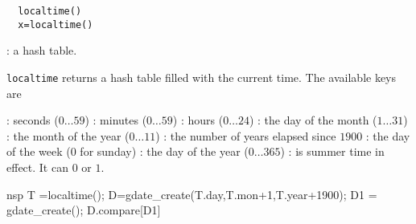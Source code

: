 \begin{mandesc}
\end{mandesc}

\begin{calling_sequence}
\begin{verbatim}
  localtime()
  x=localtime()  
\end{verbatim}
\end{calling_sequence}
\begin{parameters}
  \begin{varlist}
    : a hash table.
  \end{varlist}
\end{parameters}
\begin{mandescription}
  \verb!localtime! returns a hash table filled with the
  current time. The available keys are
  \begin{varlist}
  : seconds ($0 \dots 59$)
  : minutes ($0 \dots 59$)
  : hours ($0 \dots 24$)
  : the day of the month ($1 \dots 31$)
  : the month of the year ($0 \dots 11$)
  : the number of years elapsed since $1900$
  : the day of the week ($0$ for sunday)
  : the day of the year ($0 \dots 365$)
  : is summer time in effect. It can $0$ or $1$.
  \end{varlist}
\end{mandescription} 
\begin{examples}
  \begin{mintednsp}{nsp}
    T  =localtime();
    D=gdate_create(T.day,T.mon+1,T.year+1900);
    D1 = gdate_create();
    D.compare[D1]
  \end{mintednsp}
\end{examples}
